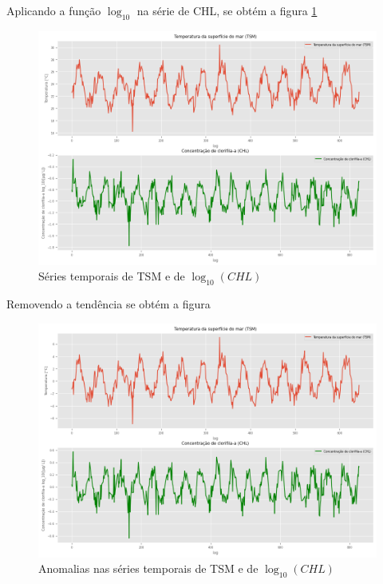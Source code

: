 \documentclass[12pt,a4paper,portuguese]{article}
\begin{document}
Aplicando a função $\log_{10}$ na série de CHL, se obtém a figura \ref{fig:lista4-2d}
\begin{figure}[H]
	\centering
	\includegraphics[width=1\linewidth]{lista4-2d}
	\caption{Séries temporais de TSM e de $\log_{10}(CHL)$}
	\label{fig:lista4-2d}
\end{figure}

Removendo a tendência se obtém a figura

\begin{figure}[H]
	\centering
	\includegraphics[width=1\linewidth]{lista4-2e}
	\caption{Anomalias nas séries temporais de TSM e de $\log_{10}(CHL)$}
	\label{fig:lista4-2e}
\end{figure}




	
	
\end{document}
